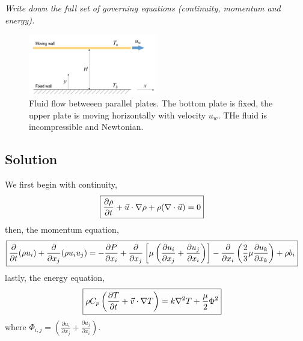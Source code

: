 

\section{}
\textit{Write down the full set of governing equations (continuity, momentum and energy).}

\begin{figure}[h]
    \centering
    \includegraphics[width=0.5\textwidth]{Questions/Figures/Q1 diagram.png}
    \caption{Fluid flow betweeen parallel plates. The bottom plate is fixed, the upper plate is moving horizontally with velocity $u_w$. THe fluid is incompressible and Newtonian.}
    \label{fig:Q1 diagram}
\end{figure}

\subsection*{Solution}
We first begin with continuity, 
\begin{align*}
    \Aboxed{\frac{\partial \rho}{\partial t} + \vec{u} \cdot \nabla \rho + \rho (\nabla \cdot \vec{u}) &= 0}
\end{align*}
then, the momentum equation,
\begin{align*}
    \Aboxed{\frac{\partial}{\partial t} (\rho u_i) + \frac{\partial}{\partial x_j} (\rho u_i u_j) &= -\frac{\partial P}{\partial x_i} + \frac{\partial}{\partial x_j} \left[ \mu \left( \frac{\partial u_i}{\partial x_j} + \frac{\partial u_j}{\partial x_i} \right) \right] - \frac{\partial}{\partial x_i} \left(\frac{2}{3} \mu \frac{\partial u_k}{\partial x_k} \right) + \rho b_i}
\end{align*}
lastly, the energy equation,
\begin{align*}
    \Aboxed{\rho C_p \left(\frac{\partial T}{\partial t} + \vec{v} \cdot \nabla T \right) &= k \nabla^2 T + \frac{\mu}{2} \Phi^2}
\end{align*}
where $\Phi_{i, j} = \left( \frac{\partial u_i}{\partial x_j} + \frac{\partial u_j}{\partial x_i} \right)$.



